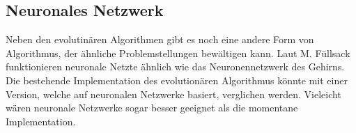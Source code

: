 
    \subsection{Neuronales Netzwerk}

      Neben den evolutinären Algorithmen gibt es noch eine andere Form von Algorithmus, der ähnliche Problemstellungen bewältigen kann.
      Laut M. Füllsack~\cite{book:fullsack} funktionieren neuronale Netzte ähnlich wie das Neuronennetzwerk des Gehirns.
      Die bestehende Implementation des evolutionären Algorithmus könnte mit einer Version, welche auf neuronalen Netzwerke basiert, verglichen werden.
      Vieleicht wären neuronale Netzwerke sogar besser geeignet als die momentane Implementation.
